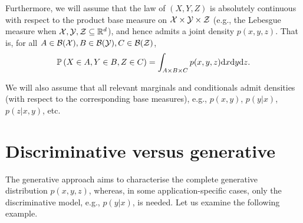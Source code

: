 Furthermore, we will assume that the law of $(X,Y,Z)$ is absolutely continuous with respect to the product base measure on ${\mathcal X}\times{\mathcal Y}\times{\mathcal Z}$ (e.g., the Lebesgue measure when ${\mathcal X},{\mathcal Y},{\mathcal Z}\subseteq{\mathbb R}^d$), and hence admits a joint density $p(x,y,z)$. That is, for all $A\in{\mathcal B}({\mathcal X}),B\in{\mathcal B}({\mathcal Y}),C\in{\mathcal B}({\mathcal Z})$,
\begin{equation}
	\mathbb{P} \left(X\in A,Y\in B, Z\in C\right) = \int_{A \times B\times C} p(x,y,z){\text{d}x}{\text{d}y}{\text{d}z}.
\end{equation}

We will also assume that all relevant marginals and conditionals admit densities (with respect to the corresponding base measures), e.g., $p(x,y)$, $p(y|x)$, $p(z|x,y)$, etc.


\section{Discriminative versus generative}

The generative approach aims to characterise the complete generative distribution $p(x,y,z)$, whereas, in some application-specific cases, only the discriminative model, e.g., $p(y|x)$, is needed. Let us examine the following example. 

